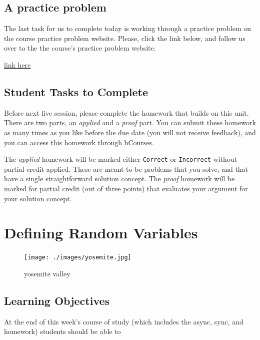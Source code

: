 \documentclass[
]{book}
\theoremstyle{definition}
\theoremstyle{definition}
\theoremstyle{definition}
\theoremstyle{definition}
\theoremstyle{remark}
\begin{document}
\hypertarget{a-practice-problem}{%
\section{A practice problem}\label{a-practice-problem}}

The last task for us to complete today is working through a practice problem on the course practice problem website. Please, click the link below, and follow us over to the the course's practice problem website.

\href{https://w203.herokuapp.com/problems/106}{link here}

\hypertarget{student-tasks-to-complete}{%
\section{Student Tasks to Complete}\label{student-tasks-to-complete}}

Before next live session, please complete the homework that builds on this unit. There are two parts, an \emph{applied} and a \emph{proof} part. You can submit these homework as many times as you like before the due date (you will not receive feedback), and you can access this homework through bCourses.

The \emph{applied} homework will be marked either \texttt{Correct} or \texttt{Incorrect} without partial credit applied. These are meant to be problems that you solve, and that have a single straightforward solution concept. The \emph{proof} homework will be marked for partial credit (out of three points) that evaluates your argument for your solution concept.

\hypertarget{defining-random-variables}{%
\chapter{Defining Random Variables}\label{defining-random-variables}}

\begin{figure}
\centering
\texttt{[image: ./images/yosemite.jpg]}
\caption{yosemite valley}
\end{figure}

\hypertarget{learning-objectives-1}{%
\section{Learning Objectives}\label{learning-objectives-1}}

At the end of this week's course of study (which includes the async, sync, and homework) students should be able to
\end{document}
